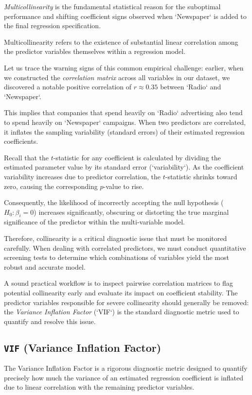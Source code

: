 \emph{Multicollinearity} is the fundamental statistical reason for the suboptimal performance and shifting coefficient signs observed when `Newspaper` is added to the final regression specification.

Multicollinearity refers to the existence of substantial linear correlation among the predictor variables themselves within a regression model.

Let us trace the warning signs of this common empirical challenge: earlier, when we constructed the \emph{correlation matrix} across all variables in our dataset, we discovered a notable positive correlation of $r \approx 0.35$ between `Radio` and `Newspaper`.

This implies that companies that spend heavily on `Radio` advertising also tend to spend heavily on `Newspaper` campaigns. When two predictors are correlated, it inflates the sampling variability (standard errors) of their estimated regression coefficients.

Recall that the $t$-statistic for any coefficient is calculated by dividing the estimated parameter value by its standard error (`variability`). As the coefficient variability increases due to predictor correlation, the $t$-statistic shrinks toward zero, causing the corresponding $p$-value to rise.

Consequently, the likelihood of incorrectly accepting the null hypothesis ($H_0: \beta_i = 0$) increases significantly, obscuring or distorting the true marginal significance of the predictor within the multi-variable model.

Therefore, collinearity is a critical diagnostic issue that must be monitored carefully. When dealing with correlated predictors, we must conduct quantitative screening tests to determine which combinations of variables yield the most robust and accurate model.

A sound practical workflow is to inspect pairwise correlation matrices to flag potential collinearity early and evaluate its impact on coefficient stability. The predictor variables responsible for severe collinearity should generally be removed: the \emph{Variance Inflation Factor} (`VIF`) is the standard diagnostic metric used to quantify and resolve this issue.

\subsection{\texttt{VIF} (Variance Inflation Factor)}

The Variance Inflation Factor is a rigorous diagnostic metric designed to quantify precisely how much the variance of an estimated regression coefficient is inflated due to linear correlation with the remaining predictor variables.

